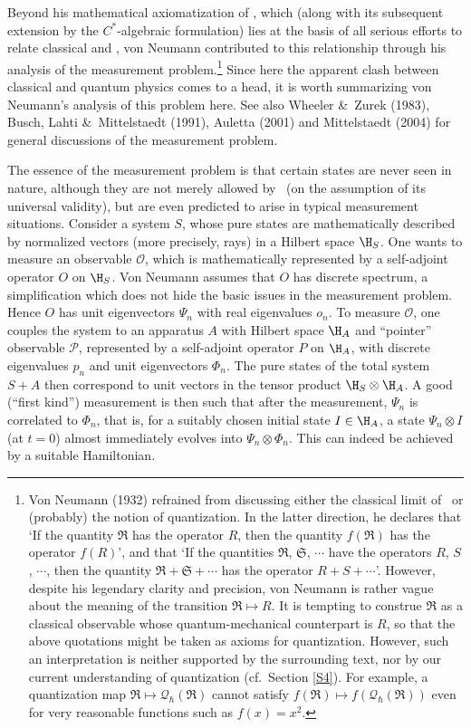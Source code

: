 \documentclass[12pt]{article}
\newcommand{\ca}{$C^*$-algebra} \newcommand{\jba}{JB-algebra}
\newcommand{\ot}{\otimes}
\newcommand{\qh}{q_{\hbar}} \newcommand{\sgh}{\sigma_{\hbar}}
\newcommand{\CQ}{{\mathcal Q}} \newcommand{\CR}{{\mathcal R}}
\renewcommand{\qh}{\CQ_{\hbar}}
\begin{document}
Beyond his mathematical axiomatization of \qm, which (along with its subsequent extension by the \ca ic formulation)  lies at the basis of all serious efforts to relate classical and \qm, von Neumann contributed to this relationship through his  analysis of the measurement problem.\footnote{Von Neumann (1932) refrained from discussing either the classical limit of \qm\ or (probably) the notion of quantization.
In the latter direction, he declares that `If the quantity $\mathfrak{R}$ has the operator $R$, then the quantity $f(\mathfrak{R})$ has the operator $f(R)$', and that `If the quantities $\mathfrak{R}$, $\mathfrak{S}$, $\cdots$ have the operators $R$, $S$, $\cdots$, then the quantity $\mathfrak{R}+\mathfrak{S}+\cdots$ has the operator $R+S+\cdots$'.
However, despite his legendary clarity and precision, von Neumann is rather vague about the meaning of the transition $\mathfrak{R}\mapsto R$. It is tempting to construe
 $\mathfrak{R}$  as a classical observable whose quantum-mechanical counterpart is $R$, so that the above quotations might be taken as axioms for quantization. However, 
such an interpretation is neither supported by the surrounding text, nor by our current understanding of quantization (cf.\ Section \ref{S4}). For example, a quantization map $\mathfrak{R}\mapsto \qh(\mathfrak{R})$ cannot satisfy $f(\mathfrak{R})\mapsto f(\qh(\mathfrak{R}))$ even for very reasonable functions such as $f(x)=x^2$.}    Since here the apparent clash between classical and quantum physics comes to a head, it is worth summarizing von Neumann's analysis of this problem here. See also Wheeler \&\ Zurek (1983), Busch, Lahti \&\ Mittelstaedt (1991), Auletta (2001) and Mittelstaedt (2004) for general discussions of the measurement problem.

  The essence of the measurement problem is that certain states are never seen in nature, although they are not merely allowed by \qm\ (on the assumption of its universal validity), but are even predicted to arise in typical measurement situations. Consider a system $S$, whose pure states are mathematically described by normalized vectors (more precisely, rays) in a Hilbert space $\H_S$. One wants to measure an observable $\mathcal{O}$, which is mathematically represented by a self-adjoint operator $O$ on $\H_S$. Von Neumann assumes that $O$ has discrete spectrum,
a simplification which does not hide the basic issues in the measurement
problem. Hence $O$ has unit eigenvectors $\Psi_n$ with real eigenvalues $o_n$. 
To measure $\mathcal{O}$, one couples the system to an apparatus $A$ with
Hilbert space $\H_A$ and ``pointer'' observable $\mathcal{P}$, represented
by a self-adjoint operator $P$ on $\H_A$, with discrete eigenvalues
$p_n$ and unit eigenvectors $\Phi_n$. The pure states of the total system $S+A$ then correspond to unit vectors in the tensor product $\H_S\otimes \H_A$.  A good (``first kind'') measurement is then such that after the measurement, $\Psi_n$ is correlated to $\Phi_n$, that is, for a suitably chosen initial state $I \in{\H}_A$, a state
 $\Psi_n\ot I$ (at $t=0$) almost immediately evolves into $\Psi_n\ot\Phi_n$. This can indeed be achieved by a suitable Hamiltonian. 
\end{document}
